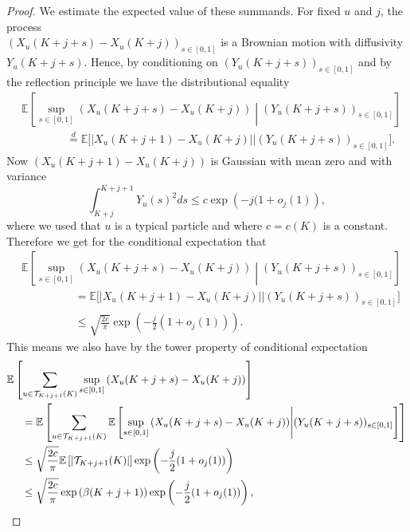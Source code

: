 \documentclass{article}
\theoremstyle{definition}
\numberwithin{equation}{section}
\numberwithin{thm}{section}
\newcommand*{\EE}{\ensuremath{\mathbb{E}}}	        	%
\begin{document}
\begin{proof}
    We estimate the expected value of these summands. 
    For fixed $u$ and $j$, the process \\ $\left(X_u(K+j+s)-X_u(K+j)\right)_{s\in [0,1]}$ is a Brownian motion with diffusivity $Y_u(K+j+s)$. Hence, by conditioning on $(Y_u(K+j+s))_{s\in [0,1]}$ and by the reflection principle we have the distributional equality
    \begin{align*}
        &\EE\left[\sup_{s\in[0,1]} \left(X_u(K+j+s)-X_u(K+j)\right)\middle\vert (Y_u(K+j+s))_{s\in [0,1]}\right] \\
        & \qquad \qquad \overset{d}{=} \EE\bigg[\big\vert X_u(K+j+1)-X_u(K+j)\big\vert\bigg\vert (Y_u(K+j+s))_{s\in [0,1]}\bigg].
    \end{align*}
    Now $(X_u(K+j+1)-X_u(K+j))$ is Gaussian with mean zero and with variance
    \begin{equation*}
        \int_{K+j}^{K+j+1} Y_u(s)^2ds \leq c\exp\left(-j(1+o_j(1)\right),
    \end{equation*}
    where we used that $u$ is a typical particle and where $c=c(K)$ is a constant. Therefore we get for the conditional expectation that 
    \begin{align*}
        &\EE\left[\sup_{s\in[0,1]} \left(X_u(K+j+s)-X_u(K+j)\right) \middle\vert (Y_u(K+j+s))_{s\in [0,1]}\right] \\
        &\hspace{2cm} = \EE\bigg[\big\vert X_u(K+j+1)-X_u(K+j)\big\vert \bigg\vert (Y_u(K+j+s))_{s\in [0,1]} \bigg] \\
        &\hspace{2cm} \leq \sqrt{\frac{2c}{\pi}}\exp\left(-\frac{j}{2}(1+o_j(1))\right).
    \end{align*}
    This means we also have by the tower property of conditional expectation
    \begin{align}
        &\EE\left[\sum_{u\in \mathcal{T}_{K+j+1}(K)}\sup_{s\in[0,1]} \left(X_u(K+j+s)-X_u(K+j)\right)\right] \nonumber\\
        & \hspace{0.5cm} = \EE\left[\sum_{u\in \mathcal{T}_{K+j+1}(K)} \EE \left[\sup_{s\in[0,1]} \left(X_u(K+j+s)-X_u(K+j)\right)\middle\vert (Y_u(K+j+s))_{s\in [0,1]} \right]\right] \nonumber \\
        & \hspace{0.5cm}\leq \sqrt{\frac{2c}{\pi}}\EE\left[\vert \mathcal{T}_{K+j+1}(K)\vert \right]\exp\left(-\frac{j}{2}(1+o_j(1))\right) \nonumber \\
        & \hspace{0.5cm}\leq \sqrt{\frac{2c}{\pi}}\exp\left(\beta(K+j +1)\right) \exp\left(-\frac{j}{2}(1+o_j(1))\right),

\end{align}
\end{proof}
\end{document}
